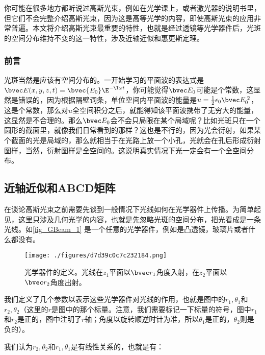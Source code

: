 
\begin{issues}
\issueDraft
\end{issues}

你可能在很多地方都听说过高斯光束，例如在光学课上，或者激光器的说明书里，但它们不会完整介绍高斯光束，因为这是高等光学的内容，即使高斯光束的应用非常普遍。本文将介绍高斯光束最重要的特性，也就是经过透镜等光学器件后，光斑的空间分布维持不变的这一特性，涉及近轴近似和惠更斯定理。%

\subsubsection{前言}
光斑当然是应该有空间分布的。一开始学习的平面波的表达式是$\bvec E(x,y,z,t)=\bvec {E_0}\E^{-\I\omega t}$，你可能觉得$\bvec E_0$可能是个常数，这显然是错误的，因为根据隔壁词条，单位空间内平面波的能量是$u=\frac{1}{2}\epsilon_0 \bvec E_0^{\;2}$，这是个常数，那么对$u$全空间积分之后，就能得知该平面波携带了无穷大的能量，这显然是不合理的。那么$\bvec E_0$会不会只局限在某个局域呢？比如光斑只在一个圆形的截面里，就像我们日常看到的那样？这也是不行的，因为光会衍射，如果某个截面的光是局域的，那么就相当于在光路上放一个小孔，光就会在孔后形成衍射图样，当然，衍射图样是全空间的。这说明真实情况下光一定会有一个全空间分布。

\subsection{近轴近似和ABCD矩阵}
在谈论高斯光束之前需要先谈到一般情况下光线如何在光学器件上传播。为简单起见，这里只涉及几何光学的内容，也就是先忽略光斑的空间分布，把光看成是一条光线。如\autoref{fig_GBeam_1} 是一个任意的光学器件，例如是凸透镜，玻璃片或者什么都没有。
\begin{figure}[ht]
\centering
\texttt{[image: ./figures/d7d39c0c7c232184.png]}
\caption{光学器件的定义。光线在$z_1$平面以$\bvec r_1$角度入射，在$z_2$平面以$\bvec r_2$角度出射。} \label{fig_GBeam_1}
\end{figure}
我们定义了几个参数以表示这些光学器件对光线的作用，也就是图中的$r_1,\theta_1$和$r_2,\theta_2$（这里的$r$是图中的那个标量。注意，我们需要标记一下标量的符号，图中$r_1$和$r_2$是正的，图中注明了$r$轴；角度以旋转顺逆时针为准，所以$\theta_1$是正的，$\theta_2$则是负的）。

我们认为$r_2,\theta_2$和$r_1,\theta_1$是有线性关系的，也就是有：

